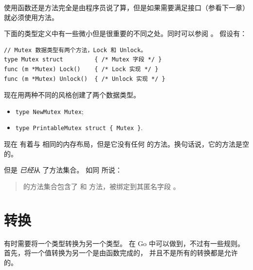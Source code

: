 使用函数还是方法完全是由程序员说了算，但是如果需要满足接口（参看下一章）就必须使用方法。

下面的类型定义中有一些微小但是很重要的不同之处。同时可以参阅 \cite[section~"Type Declarations"]{go_spec}。
假设有：
\begin{lstlisting}
// Mutex 数据类型有两个方法，Lock 和 Unlock。
type Mutex struct         { /* Mutex 字段 */ }
func (m *Mutex) Lock()    { /* Lock 实现 */ }
func (m *Mutex) Unlock()  { /* Unlock 实现 */ }
\end{lstlisting}
现在用两种不同的风格创建了两个数据类型。
\begin{itemize}
\item \lstinline|type NewMutex Mutex|;
\item \lstinline|type PrintableMutex struct { Mutex }|.
\end{itemize}
现在  有着与  相同的内存布局，但是它没有任何  的方法。换句话说，它的方法是空的。

但是  \emph{已经}从  了方法集合。
如同 \cite{go_spec} 所说：
\begin{quote}
 的方法集合包含了
 和  方法，被绑定到其匿名字段 。
\end{quote}

\section{转换}
\label{sec:conversions}
有时需要将一个类型转换为另一个类型。
在 Go 中可以做到，不过有一些规则。首先，将一个值转换为另一个是由函数完成的，
并且不是所有的转换都是允许的。

\begin{table}[H]
\begin{center}
\caption[Valid conversions]{合法的转换， 
\lstinline{float64} 同 \lstinline{float32} 类似}
\label{tab:convesion}

\end{center}
\end{table}


